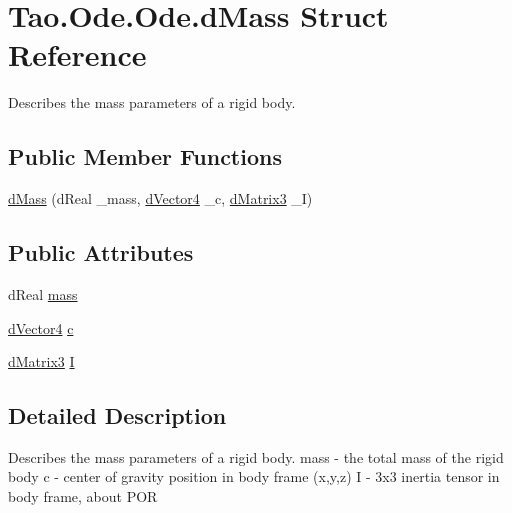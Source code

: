 \hypertarget{struct_tao_1_1_ode_1_1_ode_1_1d_mass}{
\section{Tao.Ode.Ode.dMass Struct Reference}
\label{struct_tao_1_1_ode_1_1_ode_1_1d_mass}
}


Describes the mass parameters of a rigid body.  


\subsection*{Public Member Functions}
\begin{DoxyCompactItemize}
\item 
\hyperlink{struct_tao_1_1_ode_1_1_ode_1_1d_mass_adba03401849dcc3486a391aa063b4f21}{dMass} (dReal \_\-mass, \hyperlink{struct_tao_1_1_ode_1_1_ode_1_1d_vector4}{dVector4} \_\-c, \hyperlink{struct_tao_1_1_ode_1_1_ode_1_1d_matrix3}{dMatrix3} \_\-I)
\end{DoxyCompactItemize}
\subsection*{Public Attributes}
\begin{DoxyCompactItemize}
\item 
dReal \hyperlink{struct_tao_1_1_ode_1_1_ode_1_1d_mass_af03c1b26d8a043ff6c39844b4654fa08}{mass}
\item 
\hyperlink{struct_tao_1_1_ode_1_1_ode_1_1d_vector4}{dVector4} \hyperlink{struct_tao_1_1_ode_1_1_ode_1_1d_mass_a1919bac1bd43929953b4b2bcb9bb27bd}{c}
\item 
\hyperlink{struct_tao_1_1_ode_1_1_ode_1_1d_matrix3}{dMatrix3} \hyperlink{struct_tao_1_1_ode_1_1_ode_1_1d_mass_ad83300e34fcd22390195e7b09a8c7158}{I}
\end{DoxyCompactItemize}


\subsection{Detailed Description}
Describes the mass parameters of a rigid body. mass -\/ the total mass of the rigid body c -\/ center of gravity position in body frame (x,y,z) I -\/ 3x3 inertia tensor in body frame, about POR 

